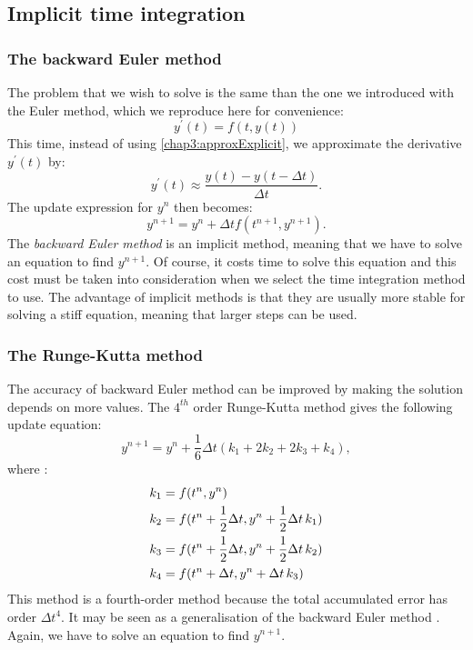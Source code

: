 	\subsection{Implicit time integration}
	
		\subsubsection*{The backward Euler method}
The problem that we wish to solve is the same than the one we introduced with the Euler method, which we reproduce here for convenience:
\begin{equation}
y^{'}(t) = f(t, y(t))
\end{equation}
This time, instead of using \eqref{chap3:approxExplicit}, we approximate the derivative $ y^{'}(t) $ by:
\begin{equation}
y^{'}(t) \approx \dfrac{y(t) - y(t-\Delta t)}{\Delta t}.
\end{equation}
The update expression for $ y^n $ then becomes:
\begin{equation}
y^{n+1} = y^n + \Delta t f(t^{n+1}, y^{n+1}).
\end{equation}
The \emph{backward Euler method} is an implicit method, meaning that we have to solve an equation to find $ y^{n+1} $. Of course, it costs time to solve this equation and this cost must be taken into consideration when we select the time integration method to use. The advantage of implicit methods is that they are usually more stable for solving a stiff equation, meaning that larger steps can be used. 

	\subsubsection*{The Runge-Kutta method}
The accuracy of backward Euler method can be improved by making the solution depends on more values. The $ 4^{th} $ order Runge-Kutta method gives the following update equation:
\begin{equation}
y^{n+1} = y^{n} + \frac{1}{6} \Delta t \left( k_1 + 2 k_2 + 2 k_3 +k_4 \right),
\end{equation}
where :
\begin{align}
k_1 &= f(t^n, y^n) \notag \\
k_2 &= f(t^n + \frac{1}{2} \Delta t, y^n + \frac{1}{2} \Delta t \, k_1) \notag \\
k_3 &= f(t^n + \frac{1}{2} \Delta t, y^n + \frac{1}{2} \Delta t \, k_2) \notag \\
k_4 &= f(t^n + \Delta t, y^n + \Delta t \, k_3) \notag
\end{align}
This method is a fourth-order method because the total accumulated error has order $ \Delta t^4 $. It may be seen as a generalisation of the backward Euler method \citep{Press92}. Again, we have to solve an equation to find $ y^{n+1} $. 


